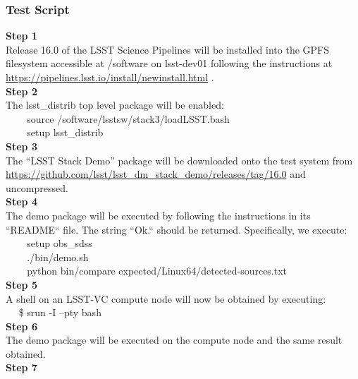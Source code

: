 \subsubsection{Test Script}\label{test-script}

\textbf{Step 1}\\
Release 16.0 of the LSST Science Pipelines will be installed into the
GPFS filesystem accessible at /software on lsst-dev01 following the
instructions at \url{https://pipelines.lsst.io/install/newinstall.html}
.\\[2\baselineskip]\textbf{Step 2}\\
The lsst\_distrib top level package will be
enabled:\\[2\baselineskip]\hspace*{0.333em} ~ ~ ~source
/software/lsstsw/stack3/loadLSST.bash\\
\hspace*{0.333em} ~ ~ ~setup lsst\_distrib\\[2\baselineskip]\textbf{Step
3}\\
The ``LSST Stack Demo'' package will be downloaded onto the test system
from
\href{https://github.com/lsst/lsst_dm_stack_demo/releases/tag/14.0}{https://github.com/lsst/lsst\_dm\_stack\_demo/releases/tag/16.0}
and uncompressed.\\[2\baselineskip]\textbf{Step 4}\\
The demo package will be executed by following the instructions in its
``README`` file. The string ``Ok.`` should be returned. Specifically, we
execute:\\
\hspace*{0.333em} ~ ~ ~setup obs\_sdss\\
\hspace*{0.333em} ~ ~ ~./bin/demo.sh\\
\hspace*{0.333em} ~ ~ ~python bin/compare
expected/Linux64/detected-sources.txt\\[2\baselineskip]\textbf{Step 5}\\
A shell on an LSST-VC compute node will now be obtained by executing:\\
\hspace*{0.333em} ~ ~\$ srun -I --pty bash\\[2\baselineskip]\textbf{Step
6}\\
The demo package will be executed on the compute node and the same
result obtained.\\[2\baselineskip]\textbf{Step 7}\\
